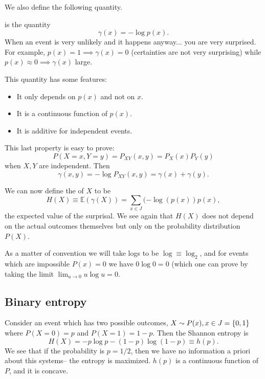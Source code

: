We also define the following quantity.
\begin{defn}
 is the quantity
\begin{equation}
    \gamma(x)=-\log p(x).
\end{equation}
When an event is very unlikely and it happens anyway... you are very surprised. For example, $p(x)=1\implies \gamma(x)=0$ (certainties are not very surprising) while $p(x)\approx 0 \implies \gamma(x)$ large.
\end{defn}
This quantity has some features:
\begin{itemize}
    \item It only depends on $p(x)$ and not on $x$.
    \item It is a continuous function of $p(x).$
    \item It is additive for independent events.
\end{itemize}
This last property is easy to prove:
\begin{equation*}
    P(X=x,Y=y)=P_{XY}(x,y)=P_X(x)P_Y(y)
\end{equation*}
when $X,Y$ are independent. Then
\begin{equation*}
    \gamma(x,y)=-\log P_{XY}(x,y)=\gamma(x)+\gamma(y).
\end{equation*}

\begin{defn}
    We can now define the  of $X$ to be
    \begin{equation}
        H(X)\equiv \mathbb{E}(\gamma(X))=\sum_{x\in J}(-\log(p(x))p(x),
    \end{equation}
    the expected value of the surprisal. We see again that $H(X)$ does not depend on the actual outcomes themselves but only on the probability distribution $P(X)$.
\end{defn}
As a matter of convention we will take logs to be $\log{} \equiv \log_2{}$, and for events which are impossible $P(x)=0$ we have $0\log 0 = 0$ (which one can prove by taking the limit $\lim_{u\to 0}u\log u =0.$

\subsection*{Binary entropy} Consider an event which has two possible outcomes, $X\sim P(x), x\in J =\{0,1\}$ where $P(X=0)=p$ and $P(X=1)=1-p$. Then the Shannon entropy is
\begin{equation}
    H(X)=-p\log p - (1-p)\log(1-p)\equiv h(p).
\end{equation}
We see that if the probability is $p=1/2$, then we have no information a priori about this systems-- the entropy is maximized. $h(p)$ is a continuous function of $P$, and it is concave.

